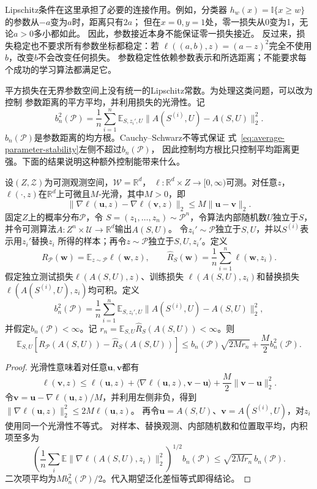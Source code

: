 Lipschitz条件在这里承担了必要的连接作用。例如，分类器
$h_w(x)=\mathbb I\{x\geq w\}$的参数从$-a$变为$a$时，距离只有$2a$；
但在$x=0,y=1$处，零一损失从0变为1，无论$a>0$多小都如此。
因此，参数接近本身不能保证零一损失接近。
反过来，损失稳定也不要求所有参数坐标都稳定：若
$\ell((a,b),z)=(a-z)^2$完全不使用$b$，改变$b$不会改变任何损失。
参数稳定性依赖参数表示和所选距离；不能要求每个成功的学习算法都满足它。

平方损失在无界参数空间上没有统一的Lipschitz常数。为处理这类问题，可以改为控制
参数距离的平方平均，并利用损失的光滑性。记
\[
 b_n^2(\mathcal P)
 =\frac1n\sum_{i=1}^n\mathbb E_{S,z_i',U}
       \|A(S^{(i)},U)-A(S,U)\|_2^2.
\]
$b_n(\mathcal P)$是参数距离的均方根。Cauchy--Schwarz不等式保证
式~\eqref{eq:average-parameter-stability}左侧不超过$b_n(\mathcal P)$，
因此控制均方根比只控制平均距离更强。下面的结果说明这种额外控制能带来什么。

\begin{theorem}[光滑损失下参数稳定性与期望泛化差]
\label{thm:smooth-parameter-generalization}
设$(Z,\mathcal Z)$为可测观测空间，$\mathcal W=\mathbb R^d$，
$\ell:\mathbb R^d\times Z\to[0,\infty)$可测。对任意$z$，
$\ell(\cdot,z)$在$\mathbb R^d$上可微且$M$-光滑，其中$M>0$，即
\[
 \|\nabla\ell(\bm u,z)-\nabla\ell(\bm v,z)\|_2
 \leq M\|\bm u-\bm v\|_2.
\]
固定$Z$上的概率分布$\mathcal P$，令
$S=(z_1,\ldots,z_n)\sim\mathcal P^n$，令算法内部随机数$U$独立于$S$，
并令可测算法$A:Z^n\times\mathcal U\to\mathbb R^d$输出$A(S,U)$。
令$z_i'\sim\mathcal P$独立于$S,U$，并以$S^{(i)}$表示用$z_i'$替换$z_i$
所得的样本；再令$z\sim\mathcal P$独立于$S,U,z_i'$。定义
\[
 R_{\mathcal P}(\bm w)=\mathbb E_{z\sim\mathcal P}\ell(\bm w,z),
 \qquad
 \hat R_S(\bm w)=\frac1n\sum_{i=1}^n\ell(\bm w,z_i).
\]
假定独立测试损失$\ell(A(S,U),z)$、训练损失
$\ell(A(S,U),z_i)$和替换损失$\ell(A(S^{(i)},U),z_i)$均可积。定义
\[
 b_n^2(\mathcal P)
 =\frac1n\sum_{i=1}^n\mathbb E_{S,z_i',U}
 \|A(S^{(i)},U)-A(S,U)\|_2^2,
\]
并假定$b_n(\mathcal P)<\infty$。记
$r_n=\mathbb E_{S,U}\hat R_S(A(S,U))<\infty$。则
\begin{equation}
 \mathbb E_{S,U}[R_{\mathcal P}(A(S,U))-\hat R_S(A(S,U))]
 \leq b_n(\mathcal P)\sqrt{2Mr_n}+\frac M2 b_n^2(\mathcal P).
 \label{eq:smooth-parameter-generalization}
\end{equation}
\end{theorem}
\begin{proof}
光滑性意味着对任意$\bm u,\bm v$都有
\[
 \ell(\bm v,z)\leq\ell(\bm u,z)
 +\langle\nabla\ell(\bm u,z),\bm v-\bm u\rangle
 +\frac M2\|\bm v-\bm u\|_2^2.
\]
令$\bm v=\bm u-\nabla\ell(\bm u,z)/M$，并利用左侧非负，得到
$\|\nabla\ell(\bm u,z)\|_2^2\leq2M\ell(\bm u,z)$。
再令$\bm u=A(S,U)$、$\bm v=A(S^{(i)},U)$，对$z_i$使用同一个光滑性不等式。
对样本、替换观测、内部随机数和位置取平均，内积项至多为
\[
 \left(\frac1n\sum_i\mathbb E\|\nabla\ell(A(S,U),z_i)\|_2^2\right)^{1/2}
 b_n(\mathcal P)
 \leq\sqrt{2Mr_n}\,b_n(\mathcal P).
\]
二次项平均为$Mb_n^2(\mathcal P)/2$。代入期望泛化差恒等式即得结论。
\end{proof}

